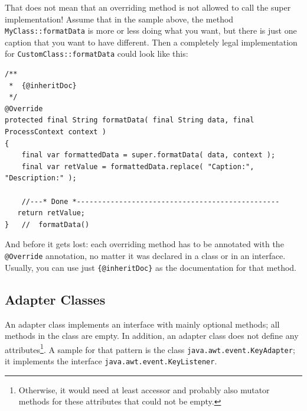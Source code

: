 \documentclass[11pt,a4paper, titlepage, parskip=half, headsepline, footsepline, cleardoublepage=current, headheight=1cm]{scrbook}
\begin{document}
That does not mean that an overriding method is not allowed to call the super implementation! Assume that in the sample above, the method \lstinline|MyClass::formatData| is more or less doing what you want, but there is just one caption that you want to have different. Then a completely legal implementation for \lstinline|CustomClass::formatData| could look like this:
\begin{lstlisting}
/**
 *  {@inheritDoc}
 */
@Override
protected final String formatData( final String data, final ProcessContext context )
{
	final var formattedData = super.formatData( data, context );
    final var retValue = formattedData.replace( "Caption:", "Description:" );
       
    //---* Done *------------------------------------------------
   return retValue;
}   //  formatData()
\end{lstlisting}

And before it gets lost: each overriding method has to be annotated with the \lstinline|@Override| annotation\autocite{ORACLE_DOC_OVERRIDE_ANNOTATION}, no matter it was declared in a class or in an interface. Usually, you can use just \verb#{@inheritDoc}# as the documentation for that method.

\subsection{Adapter Classes}\label{sec:Adapter}
An adapter class implements an interface with mainly optional methods; all methods in the class are empty. In addition, an adapter class does not define any attributes\footnote{Otherwise, it would need at least accessor and probably also mutator methods for these attributes that could not be empty.}. A sample for that pattern is the class \lstinline|java.awt.event.KeyAdapter|; it implements the interface \lstinline|java.awt.event.KeyListener|.
\end{document}
